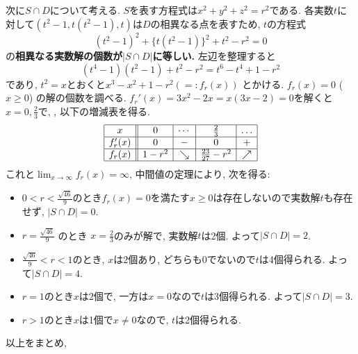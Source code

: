 次に$S\cap D$について考える. $S$を表す方程式は$x^2 + y^2 + z^2 = r^2$である. 各実数$t$に対して$(t^2-1, t(t^2-1), t)$は$D$の相異なる点を表すため, $t$の方程式
\[
(t^2 - 1)^2 + \{ t(t^2-1) \}^2 + t^2 - r^2 = 0
\]
の\textbf{相異なる実数解の個数が$|S\cap D|$に等しい.} 左辺を整理すると
\[
(t^4-1)(t^2 -1) + t^2-r^2 = t^6 - t^4 + 1 - r^2
\]
であり, $t^2 = x$とおくと$x^3 - x^2 + 1 - r^2 (=: f_r(x))$ とかける. $f_r(x) = 0$ ($x\geq 0$) の解の個数を調べる.
$f_r'(x) = 3x^2 - 2x = x(3x - 2) = 0$を解くと$x = 0, \frac{2}{3}$で,
, 以下の増減表を得る.
\[
\begin{array}{|c||c|c|c|c|}\hline
x     & 0 & \cdots   & \frac{2}{3} & \dots   \\  \hline
f_r'(x) &  0 &  -    &   0  & +  \\ \hline
f_r(x)  & 1-r^2 & \searrow &  \frac{23}{27} - r^2 & \nearrow  \\ \hline
\end{array}
\]
これと$\lim_{x\to \infty} f_r(x) = \infty$, 中間値の定理により, 次を得る:
\begin{itemize}
\item $0 < r < \frac{\sqrt{46}}{9}$のとき$f_r(x)=0$を満たす$x\geq 0$は存在しないので実数解$t$も存在せず, $|S\cap D| = 0$.
\item $r = \frac{\sqrt{46}}{9}$ のとき $x=\frac{2}{3}$のみが解で, 実数解$t$は2個. よって$|S\cap D| = 2$.
\item $\frac{\sqrt{46}}{9} < r < 1$のとき, $x$は$2$個あり, どちらも0でないので$t$は4個得られる. よって$|S\cap D| = 4$.
\item $r=1$のとき$x$は2個で, 一方は$x=0$なので$t$は3個得られる. よって$|S\cap D| = 3$.
\item $r > 1$のとき$x$は1個で$x\neq 0$なので, $t$は2個得られる.
\end{itemize}
以上をまとめ,
